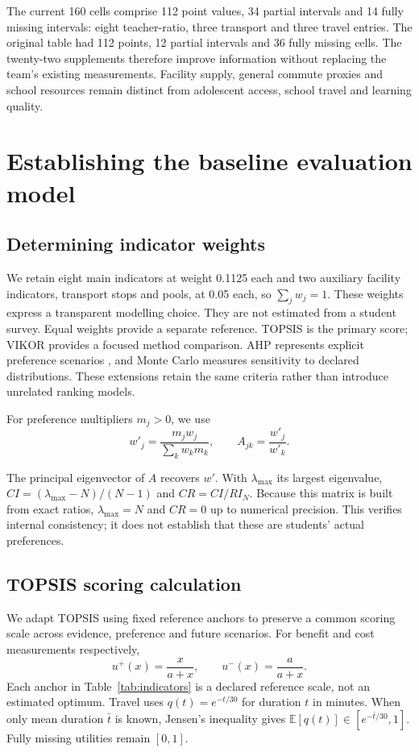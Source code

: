 The current 160 cells comprise 112 point values, 34 partial intervals and
14 fully missing intervals: eight teacher-ratio, three transport and three
travel entries. The original table had 112 points, 12 partial
intervals and 36 fully missing cells. The twenty-two supplements therefore improve
information without replacing the team's existing measurements. Facility supply,
general commute proxies and school resources remain distinct from adolescent
access, school travel and learning quality.

\section{Establishing the baseline evaluation model}
\subsection{Determining indicator weights}
We retain eight main indicators at weight 0.1125 each and two auxiliary facility
indicators, transport stops and pools, at 0.05 each, so $\sum_jw_j=1$.
These weights express a transparent modelling choice. They are not estimated
from a student survey. Equal weights provide a separate reference.
TOPSIS is the primary score; VIKOR provides a focused method comparison.
AHP represents explicit preference scenarios \cite{saaty}, and Monte Carlo measures
sensitivity to declared distributions. These extensions retain the same
criteria rather than introduce unrelated ranking models.

For preference multipliers $m_j>0$, we use
\begin{equation}
 w'_j=\frac{m_jw_j}{\sum_kw_km_k},\qquad A_{jk}=\frac{w'_j}{w'_k}.
 \label{eq:weights}
\end{equation}
\begin{samepage}
The principal eigenvector of $A$ recovers $w'$. With $\lambda_{\max}$ its
largest eigenvalue, $CI=(\lambda_{\max}-N)/(N-1)$ and $CR=CI/RI_N$.
Because this matrix is built from exact ratios, $\lambda_{\max}=N$ and
$CR=0$ up to numerical precision. This verifies internal consistency;
it does not establish that these are students' actual preferences.
\par\end{samepage}

\subsection{TOPSIS scoring calculation}
We adapt TOPSIS \cite{topsis} using fixed reference anchors to preserve a common scoring scale across evidence,
preference and future scenarios. For benefit and cost measurements respectively,
\begin{equation}
 u^{+}(x)=\frac{x}{a+x},\qquad u^{-}(x)=\frac{a}{a+x}.
\end{equation}
Each anchor in Table~\ref{tab:indicators} is a declared reference scale, not
an estimated optimum. Travel uses $q(t)=e^{-t/30}$ for duration $t$ in minutes.
When only mean duration $\bar t$ is known, Jensen's inequality gives
$\mathbb E[q(t)]\in[e^{-\bar t/30},1]$. Fully missing utilities remain $[0,1]$.

